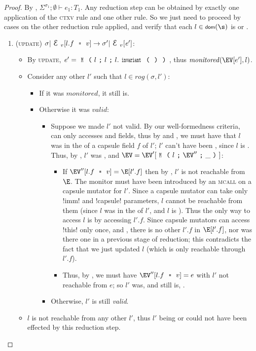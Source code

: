 \begin{proof}
By , $\Sigma^{\sigma_1};\emptyset\vdash e_1: T_1$. Any reduction step can be obtained by exactly one application of the \textsc{ctxv} rule and one other rule. So we just need to proceed by cases on the other reduction rule applied, and verify that each $l \in \dom(\s)$ is \valid or \mony.
\SS\begin{enumerate}
\item (\textsc{update}) $\sigma|\ctx_v[l.f\equals v]\rightarrow \sigma'|\ctx_v[\e']$:
	\begin{itemize}
	  \item By \textsc{update}, $\e'=\M{l}{l}{l.\invariant}$, thus $\mathit{monitored}(\EV[e'],l)$.
	  \item Consider any other $l'$ such that $l\in \mathit{rog}(\sigma,l')$:
	  \begin{itemize}
	  	\item If it was $\mathit{monitored}$, it still is.
	    \item Otherwise it was $\mathit{valid}$:
			\begin{itemize}
				\item Suppose we made $l'$ not valid. By our well-formedness criteria, \Q@invariant@ can only accesses \Q@imm@ and \Q@capsule@ fields, thus by  and , we must have that $l$ was in the \rog of a capsule field $f$ of $l'$; $l'$ can't have been \CNE, since $l$ is \muty. Thus, by \CFS, $l'$ was \CNO, and $\EV = \EV'[\M{l}{\EV''}{\_}]$:
				\begin{itemize}
					\item If $\EV''[l.f \equals v] = \E[l'.f]$ then by \CNO, $l'$ is not reachable from $\E$. The monitor must have been introduced by an \textsc{mcall} on a capsule mutator for $l'$. Since a capsule mutator can take only \Q!imm! and \Q!capsule! parameters, $l$ cannot be reachable from them (since $l$ was in the \rog of $l'$, and $l$ is \muty). Thus the only way to access $l$ is by accessing $l'.f$.
					Since capsule mutators can access \Q!this! only once, and , there is no other $l'.f$ in $\E[l'.f]$, nor was there one in a previous stage of reduction; this contradicts the fact that we just updated $l$ (which is only reachable through $l'.f$).
					\item Thus, by \CNO, we must have $\EV''[l.f \equals v] = e$ with $l'$ not reachable from $e$; so $l'$ was, and still is, \mony.
				\end{itemize}
				\item Otherwise, $l'$ is still \emph{valid}.
		  	\end{itemize}
	  \end{itemize}
	  \item $l$ is not reachable from any other $l'$, thus $l'$ being \valid or \mony could not have been effected by this reduction step.
	\end{itemize}


\end{enumerate}
\end{proof}
